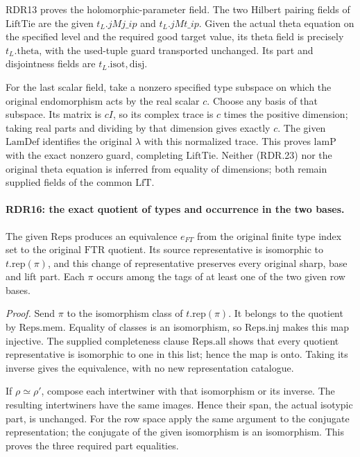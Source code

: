 RDR13 proves the holomorphic-parameter field.  The two Hilbert
pairing fields of \(\mathrm{LiftTie}\) are the given
\(t_L.jMj\_ip\) and \(t_L.jMt\_ip\).  Given the actual
theta equation on the specified level and the required good
target value, its theta field is precisely \(t_L.\mathrm{theta}\),
with the used-tuple guard transported unchanged.  Its part
and disjointness fields are \(t_L.\mathrm{isot,disj}\).

For the last scalar field, take a nonzero specified type
subspace on which the original endomorphism acts by the real
scalar \(c\).  Choose any basis of that subspace.  Its
matrix is \(cI\), so its complex trace is \(c\) times
the positive dimension; taking real parts and dividing by
that dimension gives exactly \(c\).  The given
\(\mathrm{LamDef}\) identifies the original \(\lambda\)
with this normalized trace.  This proves \(\mathrm{lamP}\)
with the exact nonzero guard, completing \(\mathrm{LiftTie}\).
Neither (RDR.23) nor the original theta equation is inferred
from equality of dimensions; both remain supplied fields of
the common \(\mathrm{LfT}\).

\paragraph{RDR16: the exact quotient of types and occurrence in the two bases.}
\label{claim:RDR16}
The given \(\mathrm{Reps}\) produces an equivalence
\(e_{FT}\) from the original finite type index set to the
original \(\mathrm{FTR}\) quotient.  Its source representative
is isomorphic to \(t.\mathrm{rep}(\pi)\), and this change
of representative preserves every original sharp, base and
lift part.  Each \(\pi\) occurs among the tags of at least
one of the two given row bases.

\emph{Proof.}
Send \(\pi\) to the isomorphism class of
\(t.\mathrm{rep}(\pi)\).  It belongs to the quotient by
\(\mathrm{Reps.mem}\).  Equality of classes is an isomorphism,
so \(\mathrm{Reps.inj}\) makes this map injective.
The supplied completeness clause \(\mathrm{Reps.all}\)
shows that every quotient representative is isomorphic to
one in this list; hence the map is onto.  Taking its inverse
gives the equivalence, with no new representation catalogue.

If \(\rho\simeq\rho'\), compose each intertwiner with that
isomorphism or its inverse.  The resulting intertwiners have
the same images.  Hence their span, the actual isotypic part,
is unchanged.  For the row space apply the same argument to
the conjugate representation; the conjugate of the given
isomorphism is an isomorphism.  This proves the three required
part equalities.

